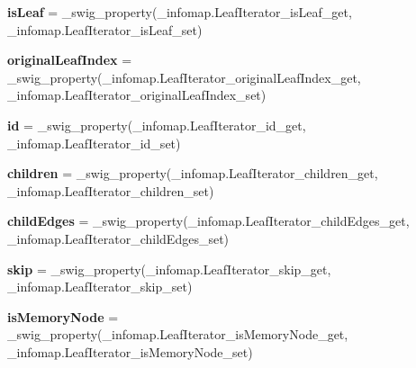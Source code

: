 \begin{DoxyCompactItemize}
{\bfseries is\+Leaf} = \+\_\+swig\+\_\+property(\+\_\+infomap.\+Leaf\+Iterator\+\_\+is\+Leaf\+\_\+get, \+\_\+infomap.\+Leaf\+Iterator\+\_\+is\+Leaf\+\_\+set)
\item 
\mbox{\label{classinfomapfolder_1_1infomap_1_1LeafIterator_ae5063b804a3926fc67e76519dda57387}} 
{\bfseries original\+Leaf\+Index} = \+\_\+swig\+\_\+property(\+\_\+infomap.\+Leaf\+Iterator\+\_\+original\+Leaf\+Index\+\_\+get, \+\_\+infomap.\+Leaf\+Iterator\+\_\+original\+Leaf\+Index\+\_\+set)
\item 
\mbox{\label{classinfomapfolder_1_1infomap_1_1LeafIterator_a507311aa5a9f7d8c01ad644239f9ae51}} 
{\bfseries id} = \+\_\+swig\+\_\+property(\+\_\+infomap.\+Leaf\+Iterator\+\_\+id\+\_\+get, \+\_\+infomap.\+Leaf\+Iterator\+\_\+id\+\_\+set)
\item 
\mbox{\label{classinfomapfolder_1_1infomap_1_1LeafIterator_ac2dcabfb592959e49ba2dbfaffbd65a0}} 
{\bfseries children} = \+\_\+swig\+\_\+property(\+\_\+infomap.\+Leaf\+Iterator\+\_\+children\+\_\+get, \+\_\+infomap.\+Leaf\+Iterator\+\_\+children\+\_\+set)
\item 
\mbox{\label{classinfomapfolder_1_1infomap_1_1LeafIterator_a2e971f2e3cfe9805faa6518b5ec23cbf}} 
{\bfseries child\+Edges} = \+\_\+swig\+\_\+property(\+\_\+infomap.\+Leaf\+Iterator\+\_\+child\+Edges\+\_\+get, \+\_\+infomap.\+Leaf\+Iterator\+\_\+child\+Edges\+\_\+set)
\item 
\mbox{\label{classinfomapfolder_1_1infomap_1_1LeafIterator_a2280fe27c2108ae12044ff86b94761e0}} 
{\bfseries skip} = \+\_\+swig\+\_\+property(\+\_\+infomap.\+Leaf\+Iterator\+\_\+skip\+\_\+get, \+\_\+infomap.\+Leaf\+Iterator\+\_\+skip\+\_\+set)
\item 
\mbox{\label{classinfomapfolder_1_1infomap_1_1LeafIterator_ab296dd5efaf0e41c61bf3b4e6f4b4d78}} 
{\bfseries is\+Memory\+Node} = \+\_\+swig\+\_\+property(\+\_\+infomap.\+Leaf\+Iterator\+\_\+is\+Memory\+Node\+\_\+get, \+\_\+infomap.\+Leaf\+Iterator\+\_\+is\+Memory\+Node\+\_\+set)
\item 

\end{DoxyCompactItemize}
